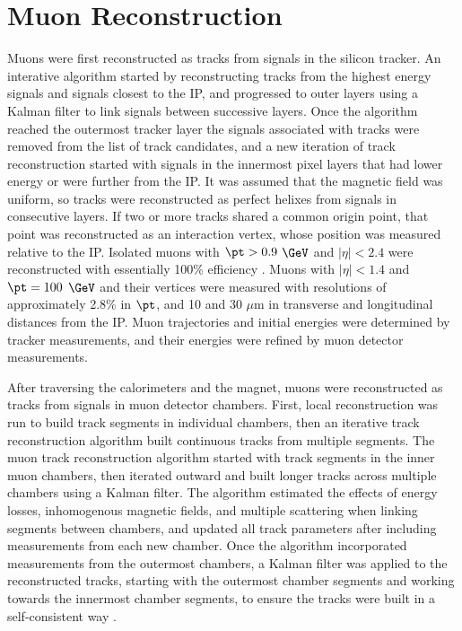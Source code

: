 \section{Muon Reconstruction}
\label{sec:muReco}




Muons were first reconstructed as tracks from signals in the silicon tracker.  An interative algorithm started 
by reconstructing tracks from the highest energy signals and signals closest to the IP, and progressed to outer layers 
using a Kalman filter to link signals between successive layers.  Once the algorithm reached the outermost tracker 
layer the signals associated with tracks were removed from the list of track candidates, and a new iteration of track 
reconstruction started with signals in the innermost pixel layers that had lower energy or were further 
from the IP.  It was assumed that the magnetic field was uniform, so tracks were reconstructed as perfect helixes 
from signals in consecutive layers.  If two or more tracks shared a common origin point, that point was reconstructed 
as an interaction vertex, whose position was measured relative to the IP.  Isolated muons with 
$\pt > 0.9$ $\GeV$ and $|\eta| < 2.4$ were reconstructed with essentially 100\% efficiency \cite{trackerPerformanceInCollisions}.  
Muons with $|\eta| < 1.4$ and $\pt = 100$ $\GeV$ and their vertices were measured with resolutions of approximately 
2.8\% in $\pt$, and 10 and 30 $\mu$m in transverse and longitudinal distances from the IP.  Muon trajectories and 
initial energies were determined by tracker measurements, and their energies were refined by muon detector measurements.

After traversing the calorimeters and the magnet, muons were reconstructed as tracks from signals in muon detector chambers.  
First, local reconstruction was run to build track segments in individual chambers, then an iterative track 
reconstruction algorithm built continuous tracks from multiple segments.  The muon track reconstruction algorithm started 
with track segments in the inner muon chambers, then iterated outward and built longer tracks across multiple chambers 
using a Kalman filter.  The algorithm estimated the effects of energy losses, inhomogenous magnetic fields, and multiple 
scattering when linking segments between chambers, and updated all track parameters after including measurements 
from each new chamber.  Once the algorithm incorporated measurements from the outermost chambers, a Kalman filter 
was applied to the reconstructed tracks, starting with the outermost chamber segments and working towards the 
innermost chamber segments, to ensure the tracks were built in a self-consistent way \cite{muonRecoFirstCollisions}.  

